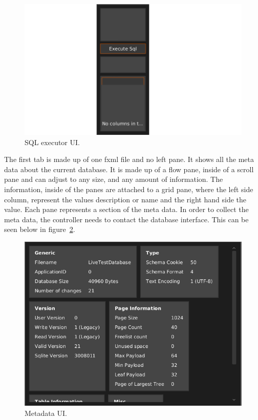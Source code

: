 \begin{figure}[H]
	\centering
	\includegraphics[scale=0.7]{images/ui_sqlexe_design_final.png}
	\caption{SQL executor UI.}
	\label{fig:ui_imp_sqlexe}
\end{figure}

The first tab is made up of one fxml file and no left pane. It shows all the meta data about the current database. It is made up of a flow pane, inside of a scroll pane and can adjust to any size, and any amount of information. The information, inside of the panes are attached to a grid pane, where the left side column, represent the values description or name and the right hand side the value. Each pane represents a section of the meta data. In order to collect the meta data, the controller needs to contact the database interface. This can be seen below in figure~\ref{fig:ui_imp_metdata}.

\begin{figure}[H]
	\centering
	\includegraphics[scale=0.32]{images/ui_meatadata_final.png}
	\caption{Metadata UI.}
	\label{fig:ui_imp_metdata}
\end{figure}

